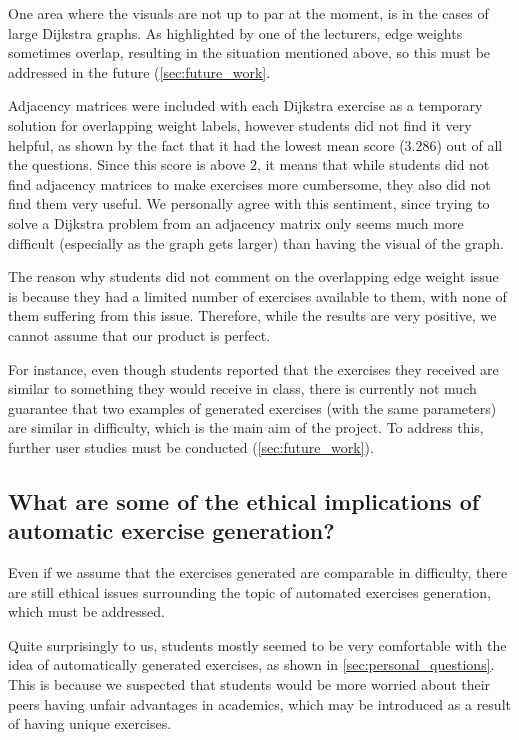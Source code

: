 \documentclass{l4proj}
\begin{document}
One area where the visuals are not up to par at the moment, is in the cases of large Dijkstra graphs. As highlighted by one of the lecturers, edge weights sometimes overlap, resulting in the situation mentioned above, so this must be addressed in the future (\autoref{sec:future_work}. 

Adjacency matrices were included with each Dijkstra exercise as a temporary solution for overlapping weight labels, however students did not find it very helpful, as shown by the fact that it had the lowest mean score ($3.286$) out of all the questions. Since this score is above $2$, it means that while students did not find adjacency matrices to make exercises more cumbersome, they also did not find them very useful. We personally agree with this sentiment, since trying to solve a Dijkstra problem from an adjacency matrix only seems much more difficult (especially as the graph gets larger) than having the visual of the graph.

The reason why students did not comment on the overlapping edge weight issue is because they had a limited number of exercises available to them, with none of them suffering from this issue. Therefore, while the results are very positive, we cannot assume that our product is perfect.

For instance, even though students reported that the exercises they received are similar to something they would receive in class, there is currently not much guarantee that two examples of generated exercises (with the same parameters) are similar in difficulty, which is the main aim of the project. To address this, further user studies must be conducted (\autoref{sec:future_work}).

\subsection{What are some of the ethical implications of automatic exercise generation?}

 Even if we assume that the exercises generated are comparable in difficulty, there are still ethical issues surrounding the topic of automated exercises generation, which must be addressed.

Quite surprisingly to us, students mostly seemed to be very comfortable with the idea of automatically generated exercises, as shown in \autoref{sec:personal_questions}. This is because we suspected that students would be more worried about their peers having unfair advantages in academics, which may be introduced as a result of having unique exercises. 
\end{document}
